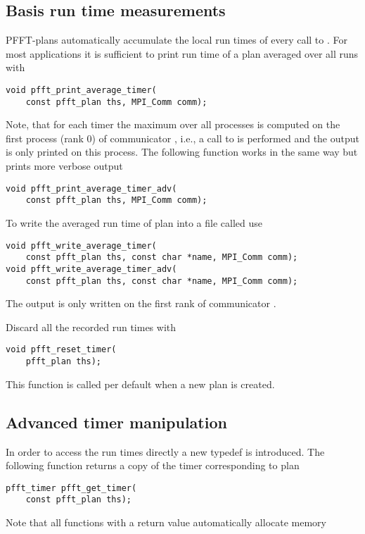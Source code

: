 \subsection{Basis run time measurements}
PFFT-plans automatically accumulate the local run times of every call to .
For most applications it is sufficient to print run time of a plan  averaged over all runs with
\begin{lstlisting}
void pfft_print_average_timer(
    const pfft_plan ths, MPI_Comm comm);
\end{lstlisting}
Note, that for each timer the maximum over all processes is computed on the first process (rank 0) of communicator ,
i.e., a call to  is performed and the output is only printed on this process.
The following function works in the same way but prints more verbose output
\begin{lstlisting}
void pfft_print_average_timer_adv(
    const pfft_plan ths, MPI_Comm comm);
\end{lstlisting}

To write the averaged run time of plan  into a file called  use
\begin{lstlisting}
void pfft_write_average_timer(
    const pfft_plan ths, const char *name, MPI_Comm comm);
void pfft_write_average_timer_adv(
    const pfft_plan ths, const char *name, MPI_Comm comm);
\end{lstlisting}
The output is only written on the first rank of communicator .

Discard all the recorded run times with
\begin{lstlisting}
void pfft_reset_timer(
    pfft_plan ths);
\end{lstlisting}
This function is called per default when a new plan is created.

\subsection{Advanced timer manipulation}
In order to access the run times directly a new typedef  is introduced.
The following function returns a copy of the timer corresponding to plan 
\begin{lstlisting}
pfft_timer pfft_get_timer(
    const pfft_plan ths);
\end{lstlisting}





Note that all functions with a  return value automatically allocate memory

